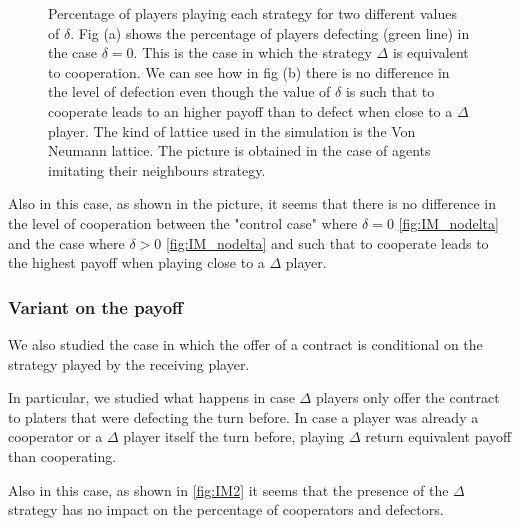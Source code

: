 \documentclass{article}
\begin{document}
\begin{figure}[htbp]
\begin{subfigure}[t]{0.47\textwidth}
  \label{fig:IM_delta} 
\end{subfigure}
\caption{Percentage of players playing each strategy for two different values of $\delta$.
Fig (a) shows the percentage of players defecting (green line) in the case $\delta =0$. This is the case in which the strategy $\Delta$ is equivalent to cooperation.
We can see how in fig (b) there is no difference in the level of defection even though the value of $\delta$ is such that to cooperate leads to an higher payoff than to defect when close to a $\Delta$ player.
The kind of lattice used in the simulation is the Von Neumann lattice.
The picture is obtained in the case of agents imitating their neighbours strategy.
}
\label{fig:IM}
\end{figure} 

Also in this case, as shown in the picture, it seems that there is no difference in the level of cooperation between the "control case" where $\delta=0$ \ref{fig:IM_nodelta} and the case where $\delta>0$  \ref{fig:IM_nodelta} and such that to cooperate leads to the highest payoff when playing close to a $\Delta$ player.

\subsubsection{Variant on the payoff}

We also studied the case in which the offer of a contract is conditional on the strategy played by the receiving player.

In particular, we studied what happens in case $\Delta$ players only offer the contract to platers that were defecting the turn before.
In case a player was already a cooperator or a $\Delta$ player itself the turn before, playing $\Delta$ return equivalent payoff than cooperating.

Also in this case, as shown in \ref{fig:IM2} it seems that the presence of the $\Delta$ strategy has no impact on the percentage of cooperators and defectors.
\end{document}
